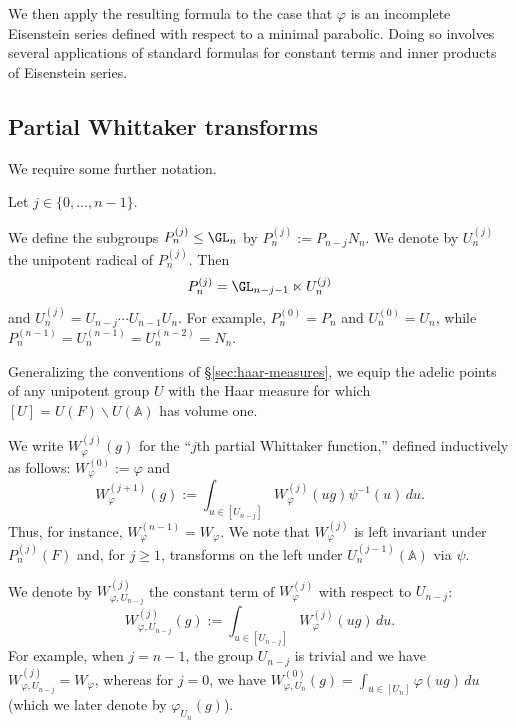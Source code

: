 We then apply the resulting formula to the case that $\varphi$ is an incomplete Eisenstein series defined with respect to a minimal parabolic.  Doing so involves several applications of standard formulas for constant terms and inner products of Eisenstein series.

\subsection{Partial Whittaker transforms}\label{sec:part-whitt-transf}
We require some further notation.

Let $j \in \{0, \dotsc, n-1\}$.

We define the subgroups $P_n^{(j)} \leq \GL_n$ by $P_n^{(j)} := P_{n-j} N_n$.  We denote by $U_n^{(j)}$ the unipotent radical of $P_n^{(j)}$.  Then
\begin{equation}\label{eq:cukcadro62}
  P_n^{(j)} = \GL_{n-j-1} \ltimes U_n^{(j)}
\end{equation}
and $U_n^{(j)} = U_{n-j} \dotsb U_{n-1} U_n$.  For example, $P_n^{(0)} = P_n$ and $U_n^{(0)} = U_n$, while $P_n^{(n-1)} = U_n^{(n-1)} = U_n^{(n-2)} = N_n$.

Generalizing the conventions of \S\ref{sec:haar-measures}, we equip the adelic points of any unipotent group $U$ with the Haar measure for which $[U] = U(F) \backslash U(\mathbb{A})$ has volume one.

We write $W^{(j)}_\varphi(g)$ for the ``$j$th partial Whittaker function,'' defined inductively as follows: $W_\varphi^{(0)} := \varphi$ and
\begin{equation*}
  W_{\varphi}^{(j+1)}(g) := \int_{u \in [U_{n-j}]} W_\varphi^{(j)}(u g) \psi^{-1}(u) \, d u.
\end{equation*}
Thus, for instance, $W_\varphi^{(n-1)} = W_\varphi$.   We note that $W_\varphi^{(j)}$ is left invariant under $P_n^{(j)}(F)$ and, for $j \geq 1$, transforms on the left under $U_n^{(j-1)}(\mathbb{A})$ via $\psi$.

We denote by $W^{(j)}_{\varphi,U_{n-j}}$ the constant term of $W^{(j)}_{\varphi}$ with respect to $U_{n-j}$:
\begin{equation*}
  W^{(j)}_{\varphi,U_{n-j}}(g) :=
  \int_{u \in [U_{n-j}]} W_\varphi^{(j)}(u g) \, d u.
\end{equation*}
For example, when $j = n-1$, the group $U_{n-j}$ is trivial and we have $W_{\varphi,U_{n-j}}^{(j)} = W_{\varphi}$, whereas for $j=0$, we have $W_{\varphi,U_{n}}^{(0)}(g) = \int_{u \in [U_n]} \varphi(u g) \, d u$ (which we  later denote by $\varphi_{U_n}(g)$).

